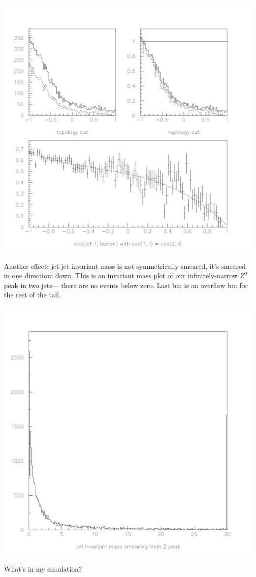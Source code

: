 \documentclass[landscape]{article}
\begin{document}
\includegraphics[width=0.65\linewidth]{jet_confusion4.pdf}

\pagebreak

Another effect: jet-jet invariant mass is not symmetrically smeared,
it's smeared in one direction: down.  This is an invariant mass plot
of our infinitely-narrow $Z^0$ peak in two jets--- there are no events
below zero.  Last bin is an overflow bin for the rest of the tail.

\vfill

\includegraphics[width=0.65\linewidth]{z_smearing_with_overflow.pdf}

\pagebreak

What's in my simulation?
\end{document}
